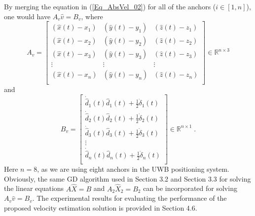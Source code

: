 \documentclass{article}
\begin{document}
By merging the equation in (\ref{Eq_AbsVel_02}) for all of the anchors ($i \in [1,n]$), one would have $A_v \hat{v} = B_v$, where 
\begin{equation}\label{Eq_AbsVel_03}
A_v = \left[\begin{matrix}
 (\hat{x}(t) - x_1) & (\hat{y}(t) - y_1) & (\hat{z}(t) - z_1) \\
 (\hat{x}(t) - x_2) & (\hat{y}(t) - y_2) & (\hat{z}(t) - z_2) \\
 (\hat{x}(t) - x_3) & (\hat{y}(t) - y_3) & (\hat{z}(t) - z_3) \\
\vdots & \vdots & \vdots  \\
 (\hat{x}(t) - x_n) & (\hat{y}(t) - y_n) & (\hat{z}(t) - z_n) \\
\end{matrix}\right] \in \mathbb{R}^{n \times 3}
\end{equation}
and
\begin{equation} \label{Eq_AbsVel_04}
B_v = \left[\begin{matrix}
\dot{\hat{d}}_1(t) \hat{d}_1(t) + \frac{1}{2} \dot{\delta}_1(t) \\
\dot{\hat{d}}_2(t) \hat{d}_2(t) + \frac{1}{2} \dot{\delta}_2(t) \\
\dot{\hat{d}}_3(t) \hat{d}_3(t) + \frac{1}{2} \dot{\delta}_3(t) \\
\vdots \\
\dot{\hat{d}}_n(t) \hat{d}_n(t) + \frac{1}{2} \dot{\delta}_n(t) \\
\end{matrix}\right] \in \mathbb{R}^{n \times 1} \;.
\end{equation}
Here $n=8$, as we are using eight anchors in the UWB positioning system. 
Obviously, the same GD algorithm used in Section 3.2 and Section 3.3 for solving the linear equations $A\hat{X} = B$ and $A_2 \hat{X}_2 = B_2$ can be incorporated for solving $A_v \hat{v} = B_v$. 
The experimental results for evaluating the performance of the proposed velocity estimation solution is provided in Section 4.6. \\
\end{document}

